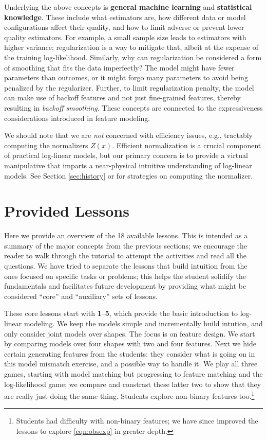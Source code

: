 \documentclass[11pt,letterpaper]{article}
\newcommand{\Note}[1]{}
\renewcommand{\Note}[1]{\hl{[#1]}}  %
\newcommand{\NoteSigned}[3]{{\sethlcolor{#2}\Note{#1: #3}}}
\newcommand{\NoteFF}[1]{\NoteSigned{FF}{LightBlue}{#1}}
\newcommand{\NumLessons}[0]{18}%
\begin{document}
Underlying the above concepts is \textbf{general machine learning} and 
\textbf{statistical knowledge}. These include what estimators are,  how different data or model configurations 
affect their quality, and how to limit adverse or prevent lower quality estimators. For example, 
a small sample size leads to estimators with higher variance; regularization is a way to mitigate that, albeit at the expense of 
the training log-likelihood. 
Similarly, why can regularization be considered a form of smoothing that fits the data 
imperfectly? The model might have fewer parameters than 
outcomes, or it might forgo many parameters to avoid being penalized by 
the regularizer.  Further, to limit regularization penalty, the model can make 
use of backoff features and not just fine-grained features, thereby resulting 
in \textit{backoff smoothing}. These concepts are connected to the expressiveness 
considerations introduced in feature modeling.

We should note that we are \textit{not} concerned with efficiency issues, e.g.,  
tractably computing the normalizers $Z(x)$. Efficient normalization
is a crucial component of practical log-linear models, but our primary concern is to provide a virtual 
manipulative that imparts a near-physical intuitive understanding of log-linear models. See Section 
\ref{sec:history} or  for strategies on computing
the normalizer.



\section{Provided Lessons}\label{sec:lessons}
Here we provide an overview of the \NumLessons{} available lessons. This is intended as a 
summary of the major concepts from the previous sections; we encourage the reader to 
walk through the tutorial to attempt the activities and read all the questions. We have tried to 
separate the lessons that build intuition from the ones focused on specific tasks or problems; this helps 
the student solidify the fundamentals and facilitates future development by providing what might be considered 
``core'' and ``auxiliary'' sets of lessons.

These core lessons start with \textbf{1}--\textbf{5}, which provide the basic introduction to log-linear modeling. We keep 
the models simple and incrementally build intution, and only consider joint models over shapes. The focus is 
on feature design. We start by comparing models over four shapes with two and four features. 
Next we hide certain generating features from the students: they 
consider what is going on in this model mismatch exercise, and a possible way to handle it. We play all three games, 
starting with model matching but progressing to feature matching and the log-likelihood game; we compare and 
constrast these latter two to show that they are really just doing the same thing. Students explore 
non-binary features too.\footnote{Students had difficulty with non-binary features; 
we have since improved the lessons to explore \eqref{eqn:obsexp} in greater depth.} 
\end{document}
